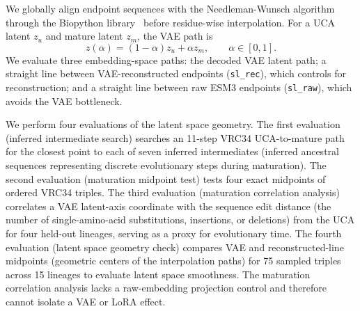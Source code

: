 We globally align endpoint sequences with the Needleman-Wunsch
algorithm~\cite{needleman1970general} through the Biopython
library~\cite{cock2009biopython} before residue-wise interpolation. For a UCA
latent $z_u$ and mature latent $z_m$, the VAE path is
\begin{equation} z(\alpha)=(1-\alpha)z_u+\alpha z_m,\qquad \alpha\in[0,1]. \end{equation}
We evaluate three embedding-space paths: the decoded VAE latent path; a straight line between VAE-reconstructed endpoints (\texttt{sl\_rec}), which controls for reconstruction; and a straight line between raw ESM3 endpoints (\texttt{sl\_raw}), which avoids the VAE bottleneck.

We perform four evaluations of the latent space geometry. The first evaluation (inferred intermediate search) searches an 11-step VRC34 UCA-to-mature path for the closest point to each of seven inferred intermediates (inferred ancestral sequences representing discrete evolutionary steps during maturation). The second evaluation (maturation midpoint test) tests four exact midpoints of ordered VRC34 triples. The third evaluation (maturation correlation analysis) correlates a VAE latent-axis coordinate with the sequence edit distance (the number of single-amino-acid substitutions, insertions, or deletions) from the UCA for four held-out lineages, serving as a proxy for evolutionary time. The fourth evaluation (latent space geometry check) compares VAE and reconstructed-line midpoints (geometric centers of the interpolation paths) for 75 sampled triples across 15 lineages to evaluate latent space smoothness. The maturation correlation analysis lacks a raw-embedding projection control and therefore cannot isolate a VAE or LoRA effect.
